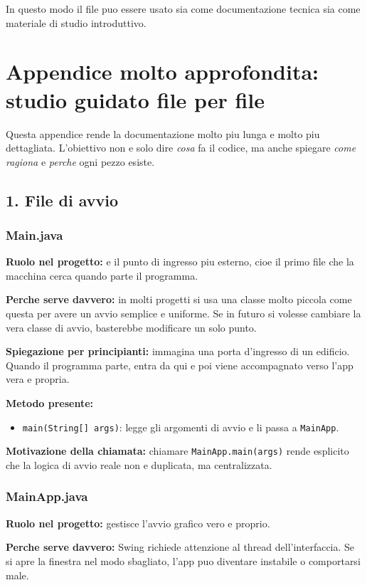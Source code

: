 \documentclass[12pt,a4paper]{article}
\begin{document}
In questo modo il file puo essere usato sia come documentazione tecnica sia come materiale di studio introduttivo.

\newpage
\section{Appendice molto approfondita: studio guidato file per file}
Questa appendice rende la documentazione molto piu lunga e molto piu dettagliata.
L'obiettivo non e solo dire \emph{cosa} fa il codice, ma anche spiegare \emph{come ragiona} e \emph{perche} ogni pezzo esiste.

\subsection{1. File di avvio}

\subsubsection*{Main.java}
\textbf{Ruolo nel progetto:} e il punto di ingresso piu esterno, cioe il primo file che la macchina cerca quando parte il programma.

\textbf{Perche serve davvero:} in molti progetti si usa una classe molto piccola come questa per avere un avvio semplice e uniforme. Se in futuro si volesse cambiare la vera classe di avvio, basterebbe modificare un solo punto.

\textbf{Spiegazione per principianti:} immagina una porta d'ingresso di un edificio. Quando il programma parte, entra da qui e poi viene accompagnato verso l'app vera e propria.

\textbf{Metodo presente:}
\begin{itemize}
  \item \texttt{main(String[] args)}: legge gli argomenti di avvio e li passa a \texttt{MainApp}.
\end{itemize}

\textbf{Motivazione della chiamata:} chiamare \texttt{MainApp.main(args)} rende esplicito che la logica di avvio reale non e duplicata, ma centralizzata.

\subsubsection*{MainApp.java}
\textbf{Ruolo nel progetto:} gestisce l'avvio grafico vero e proprio.

\textbf{Perche serve davvero:} Swing richiede attenzione al thread dell'interfaccia. Se si apre la finestra nel modo sbagliato, l'app puo diventare instabile o comportarsi male.
\end{document}
